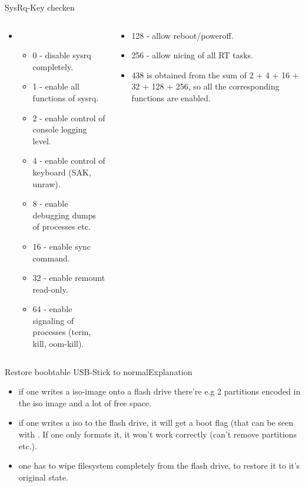 \begin{frame}[fragile, t]{SysRq-Key checken}
  \begin{columns}
    \begin{column}[t]{0.5\textwidth}
      \begin{itemize}
        \item {}
          \begin{itemize}
            \item 0 - disable sysrq completely.
            \item 1 - enable all functions of sysrq.
            \item 2 - enable control of console logging level.
            \item 4 - enable control of keyboard (SAK, unraw).
            \item 8 - enable debugging dumps of processes etc.
            \item 16 - enable sync command.
            \item 32 - enable remount read-only.
            \item 64 - enable signaling of processes (term, kill, oom-kill).
          \end{itemize}
      \end{itemize}
    \end{column}
    \begin{column}[t]{0.5\textwidth}
      \begin{itemize}
        \item 128 - allow reboot/poweroff.
        \item 256 - allow nicing of all RT tasks.
      \end{itemize}
      \vspace{0.3cm}
      \begin{Sidenote}
        \begin{itemize}
         \scriptsize
          \item 438 is obtained from the sum of 2 + 4 + 16 + 32 + 128 + 256, so all the corresponding functions are enabled.
        \end{itemize}
      \end{Sidenote}
    \end{column}
  \end{columns}
\end{frame}

\begin{frame}[fragile]{Restore boobtable USB-Stick to normal}{Explanation}
  \begin{itemize}
    \item if one writes a iso-image onto a flash drive there're e.g 2 partitions encoded in the iso image and a lot of free space.
    \item if one writes a iso to the flash drive, it will get a \alert{boot flag} (that can be seen with . If one only formats it, it won't work correctly (can't remove partitions etc.).
    \item one has to wipe filesystem completely from the flash drive, to restore it to it's original state.
  \end{itemize}
\end{frame}

